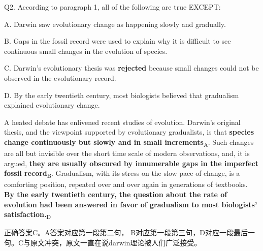 \begin{blk}
    \begin{qst}
        Q2. According to paragraph 1, all of the following are true EXCEPT:
    \end{qst}

    \begin{chc}
        A. Darwin saw evolutionary change as happening slowly and gradually.

        B. Gaps in the fossil record were used to explain why it is difficult to see continuous small changes in the evolution of species.

        C. Darwin’s evolutionary thesis was \textbf{rejected} because small changes could not be observed in the evolutionary record.

        D. By the early twentieth century, most biologists believed that gradualism explained evolutionary change.
    \end{chc}

    \begin{psgq}
        A heated debate has enlivened recent studies of evolution. Darwin’s original thesis, and the viewpoint supported by evolutionary gradualists, is that \textbf{species change continuously but slowly and in small increments}\textsubscript{A}. Such changes are all but invisible over the short time scale of modern observations, and, it is argued, \textbf{they are usually obscured by innumerable gaps in the imperfect fossil record}\textsubscript{B}. Gradualism, with its stress on the slow pace of change, is a comforting position, repeated over and over again in generations of textbooks. \textbf{By the early twentieth century, the question about the rate of evolution had been answered in favor of gradualism to most biologists’ satisfaction.}\textsubscript{D}
    \end{psgq}

    \begin{nlz}
        正确答案C。A答案对应第一段第二句， B对应第一段第三句，D对应一段最后一句。C与原文冲突，原文一直在说darwin理论被人们广泛接受。
    \end{nlz}
\end{blk}
